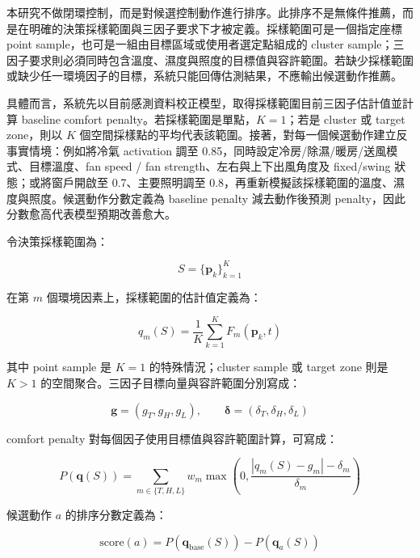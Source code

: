 \documentclass[12pt,a4paper]{article}
\begin{document}
本研究不做閉環控制，而是對候選控制動作進行排序。此排序不是無條件推薦，而是在明確的決策採樣範圍與三因子要求下才被定義。採樣範圍可是一個指定座標 point sample，也可是一組由目標區域或使用者選定點組成的 cluster sample；三因子要求則必須同時包含溫度、濕度與照度的目標值與容許範圍。若缺少採樣範圍或缺少任一環境因子的目標，系統只能回傳估測結果，不應輸出候選動作推薦。


具體而言，系統先以目前感測資料校正模型，取得採樣範圍目前三因子估計值並計算 baseline comfort penalty。若採樣範圍是單點，$K=1$；若是 cluster 或 target zone，則以 $K$ 個空間採樣點的平均代表該範圍。接著，對每一個候選動作建立反事實情境：例如將冷氣 activation 調至 0.85，同時設定冷房/除濕/暖房/送風模式、目標溫度、fan speed / fan strength、左右與上下出風角度及 fixed/swing 狀態；或將窗戶開啟至 0.7、主要照明調至 0.8，再重新模擬該採樣範圍的溫度、濕度與照度。候選動作分數定義為 baseline penalty 減去動作後預測 penalty，因此分數愈高代表模型預期改善愈大。


令決策採樣範圍為：


\[
S=\{\mathbf{p}_k\}_{k=1}^{K}
\]

在第 $m$ 個環境因素上，採樣範圍的估計值定義為：


\[
q_m(S)=\frac{1}{K}\sum_{k=1}^{K}F_m(\mathbf{p}_k,t)
\]

其中 point sample 是 $K=1$ 的特殊情況；cluster sample 或 target zone 則是 $K>1$ 的空間聚合。三因子目標向量與容許範圍分別寫成：


\[
\mathbf{g}=(g_T,g_H,g_L),\qquad \boldsymbol{\delta}=(\delta_T,\delta_H,\delta_L)
\]

comfort penalty 對每個因子使用目標值與容許範圍計算，可寫成：


\[
P(\mathbf{q}(S))=\sum_{m\in\{T,H,L\}} w_m \max\left(0,\frac{|q_m(S)-g_m|-\delta_m}{\delta_m}\right)
\]

候選動作 $a$ 的排序分數定義為：


\[
\mathrm{score}(a)=P(\mathbf{q}_{\mathrm{base}}(S))-P(\mathbf{q}_{a}(S))
\]
\end{document}
